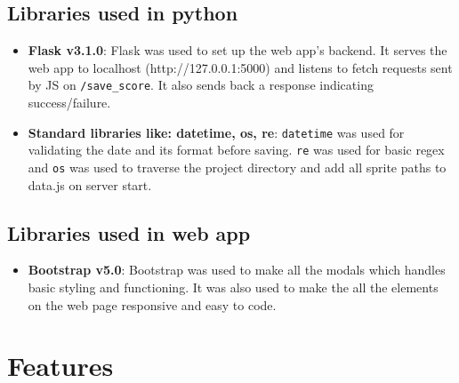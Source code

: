 \documentclass[12pt]{article}
\begin{document}
\subsection{Libraries used in python}
\begin{itemize}
    \item \textbf{Flask v3.1.0}: Flask was used to set up the web app's backend. It serves the web app to localhost (http://127.0.0.1:5000) and listens to fetch requests sent by JS on \texttt{/save\_score}. It also sends back a response indicating success/failure.
    \item \textbf{Standard libraries like: datetime, os, re}: \texttt{datetime} was used for validating the date and its format before saving. \texttt{re} was used for basic regex and \texttt{os} was used to traverse the project directory and add all sprite paths to data.js on server start.
\end{itemize}

\subsection{Libraries used in web app}
\begin{itemize}
    \item \textbf{Bootstrap v5.0}: Bootstrap was used to make all the modals which handles basic styling and functioning. It was also used to make the all the elements on the web page responsive and easy to code.
\end{itemize}

\section{Features}
\end{document}

